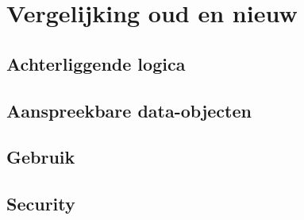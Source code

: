 
\chapter{Vergelijking oud en nieuw}%
\label{ch:vergelijking}


\lipsum[76-80]

\section{Achterliggende logica}

\lipsum[76-80]

\section{Aanspreekbare data-objecten}

\lipsum[76-80]

\section{Gebruik}

\lipsum[76-80]

\section{Security}

\lipsum[76-80]